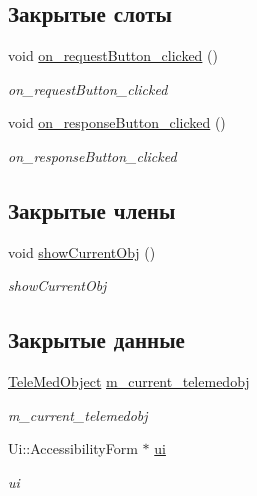 \subsection*{Закрытые слоты}
\begin{DoxyCompactItemize}
\item 
void \hyperlink{classAccessibilityForm_a47e343e6d2668e2fb9d79c3a4e342bfd}{on\+\_\+request\+Button\+\_\+clicked} ()
\begin{DoxyCompactList}\small\item\em on\+\_\+request\+Button\+\_\+clicked \end{DoxyCompactList}\item 
void \hyperlink{classAccessibilityForm_aa9ec98dd84724349a77477f0431298dc}{on\+\_\+response\+Button\+\_\+clicked} ()
\begin{DoxyCompactList}\small\item\em on\+\_\+response\+Button\+\_\+clicked \end{DoxyCompactList}\end{DoxyCompactItemize}
\subsection*{Закрытые члены}
\begin{DoxyCompactItemize}
\item 
void \hyperlink{classAccessibilityForm_adc4f7fd9320458525471566366e33030}{show\+Current\+Obj} ()
\begin{DoxyCompactList}\small\item\em show\+Current\+Obj \end{DoxyCompactList}\end{DoxyCompactItemize}
\subsection*{Закрытые данные}
\begin{DoxyCompactItemize}
\item 
\hyperlink{classTeleMedObject}{Tele\+Med\+Object} \hyperlink{classAccessibilityForm_a7abf8a65145b6a1164e15fe5667156ab}{m\+\_\+current\+\_\+telemedobj}
\begin{DoxyCompactList}\small\item\em m\+\_\+current\+\_\+telemedobj \end{DoxyCompactList}\item 
Ui\+::\+Accessibility\+Form $\ast$ \hyperlink{classAccessibilityForm_a410e78e46d46b2e5785277eba28fc8de}{ui}
\begin{DoxyCompactList}\small\item\em ui \end{DoxyCompactList}\end{DoxyCompactItemize}


